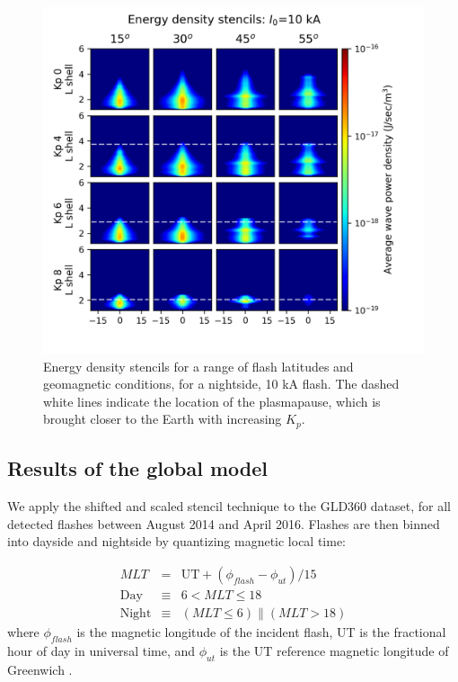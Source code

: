 \begin{figure}[h!]
\begin{center}
\includegraphics{figures/wave_energy_vs_L_stencils.png}
\caption[Energy density stencils]{Energy density stencils for a range of flash latitudes and geomagnetic conditions, for a nightside, 10 kA flash. The dashed white lines indicate the location of the plasmapause, which is brought closer to the Earth with increasing $K_p$.}
\label{fig:energy_stencils}
\end{center}
\end{figure}

\subsection{Results of the global model}
We apply the shifted and scaled stencil technique to the GLD360 dataset, for all detected flashes between August 2014 and April 2016. Flashes are then binned into dayside and nightside by quantizing magnetic local time:

\begin{eqnarray}
\label{eqn:MLT}
MLT & = & \mathrm{UT} + (\phi_{flash} - \phi_{ut})/15 \\
\mathrm{Day} & \equiv & 6 < MLT \leq 18 \\
\mathrm{Night} & \equiv & (MLT \leq 6) \parallel (MLT > 18)
\end{eqnarray}
\noindent where $\phi_{flash}$ is the magnetic longitude of the incident flash, UT is the fractional hour of day in universal time, and $\phi_{ut}$ is the UT reference magnetic longitude of Greenwich \citep{Laundal2016}.

